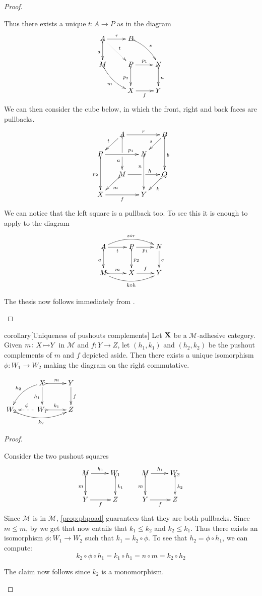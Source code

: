 \documentclass[a4paper,UKenglish,cleveref,pdftex, thm-restate,numberwithinsect]{lipics}
\newcommand{\mto}[0]{\scalebox{1}{$\rightarrowtail$}}
\def\X{\textbf {\textup{X}}}
\def\Y{\textbf {\textup{Y}}}
\begin{document}
{\begin{proof}
\begin{proofEnd}
	Thus there exists a unique $t\colon A\to P$ as in the diagram
\[\xymatrix{A \ar@{>->}[d]_{a} \ar@{.>}[dr]^{t}\ar[r]^{r} &B \ar@{>->}@/^.2cm/[dr]^{s} \\ M \ar@{>->}@/_.2cm/[dr]_{m}&P\ar[r]^{p_1}  \ar@{>->}[d]_{p_2}& N \ar@{>->}[d]^{n}\\ &X \ar[r]_{f} & Y}\]
	We can then consider the cube below, in which the front, right and back faces are pullbacks.
		\[\xymatrix@C=15pt@R=15pt{&A\ar@{>->}[dd]|\hole_(.65){a}\ar[rr]^{r} \ar[dl]_{t} && B \ar@{>->}[dd]^{b} \ar[dl]_{s} \\ P  \ar@{>->}[dd]_{p_2}\ar[rr]^(.7){p_1} & & N \ar@{>->}[dd]_(.3){n}\\&M\ar[rr]|\hole^(.65){h} \ar@{>->}[dl]^{m} && Q \ar@{>->}[dl]^{k} \\X \ar[rr]_{f} & & Y}\]
	We can notice that the left square is a pullback too. To see this it is enough to apply  to the diagram
	\[\xymatrix{A  \ar@/^.4cm/[rr]^{s\circ r}\ar@{>->}[d]_{a} \ar[r]_{t}& \ar[r]_{p_1} P \ar@{>->}[d]^{p_2}& N \ar[d]^{c}\\ M \ar@/_.4cm/[rr]_{k\circ h}\ar@{>->}[r]^{m}& X \ar[r]^{f}& Y}\]

	The thesis now follows immediately from . \qedhere 
\end{proofEnd}
\end{proof}

\noindent
\parbox{10cm}{ 
\begin{theoremEnd}[category=sec2]{corollary}[Uniqueness of pushouts complements]\label{lem:pocomp} 
Let $\X$ be a $\mathcal{M}$-adhesive category. Given $m\colon X\mto Y$ in $\mathcal{M}$ and $f\colon Y\to Z$, let $(h_1, k_1)$ and $(h_2, k_2)$ be the pushout complements of $m$  and $f$ depicted aside. Then there exists a unique isomorphism $\phi\colon W_1\to W_2$ making the diagram on the right commutative.
\end{theoremEnd}}
\parbox{3cm}{$\xymatrix{&X \ar@{>->}[r]^{m} \ar[d]_{h_1} \ar@/_.3cm/[dl]_{h_2}& Y \ar[d]^{f} \\ W_2 \ar@{>->}@/_.4cm/[rr]_{k_2} &W_1 \ar@{.>}[l]_{\phi} \ar@{>->}[r]^{k_1} & Z }$}

\begin{proof}\begin{proofEnd}
	Consider the two pushout squares
	\[\xymatrix{M \ar[r]^{h_1}\ar@{>->}[d]_{m}& W_1 \ar@{>->}[d]^{k_1} & M \ar@{>->}[d]_{m} \ar[r]^{h_1}& W_2 \ar@{>->}[d]^{k_2}\\Y\ar[r]_{f}&Z &Y \ar[r]_{f}&Z}\]
	Since $\mathcal{M}$ is in $\mathcal{M}$, \cref{prop:pbpoad} guarantees that they are both pullbacks.
	Since $m\leq m$, by  we get that now entails that $k_1\leq k_2$ and $k_2\leq k_1$. Thus there exists an isomorphism $\phi\colon W_1\to W_2$ such that $k_1=k_2\circ \phi$. To see that $h_2=\phi\circ h_1$, we can compute:
	\[
	k_2\circ \phi \circ h_1  = k_1\circ h_1= n\circ m= k_2\circ h_2\]
	
	The claim now follows since $k_2$ is a monomorphism.
	\end{proofEnd} 
\end{proof}
}
\end{document}
